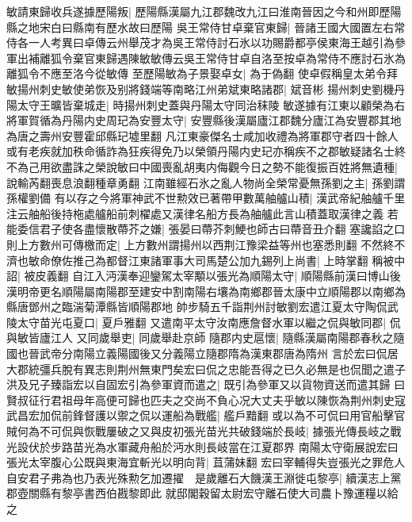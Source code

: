 敏請東歸收兵遂據歷陽叛|{
	歷陽縣漢屬九江郡魏改九江曰淮南晉因之今和州即歷陽縣之地宋白曰縣南有歷水故曰歷陽}
吳王常侍甘卓棄官東歸|{
	晉諸王國大國置左右常侍各一人考異曰卓傳云州舉茂才為吳王常侍討石氷以功賜爵都亭侯東海王越引為參軍出補離狐令棄官東歸遇陳敏敏傳云吳王常侍甘卓自洛至按卓為常侍不應討石氷為離狐令不應至洛今從敏傳}
至歷陽敏為子景娶卓女|{
	為于偽翻}
使卓假稱皇太弟令拜敏揚州刺史敏使弟恢及别將錢端等南略江州弟斌東略諸郡|{
	斌音彬}
揚州刺史劉機丹陽太守王曠皆棄城走|{
	時揚州刺史蓋與丹陽太守同治秣陵}
敏遂據有江東以顧榮為右將軍賀循為丹陽内史周玘為安豐太守|{
	安豐縣後漢屬廬江郡魏分廬江為安豐郡其地為唐之壽州安豐霍邱縣玘墟里翻}
凡江東豪傑名士咸加收禮為將軍郡守者四十餘人或有老疾就加秩命循詐為狂疾得免乃以榮領丹陽内史玘亦稱疾不之郡敏疑諸名士終不為己用欲盡誅之榮說敏曰中國喪亂胡夷内侮觀今日之勢不能復振百姓將無遺種|{
	說輸芮翻喪息浪翻種章勇翻}
江南雖經石氷之亂人物尚全榮常憂無孫劉之主|{
	孫劉謂孫權劉備}
有以存之今將軍神武不世勲效已著帶甲數萬舳艫山積|{
	漢武帝紀舳艫千里注云舳船後持柂處艫船前刺櫂處又漢律名船方長為舳艫此言山積蓋取漢律之義}
若能委信君子使各盡懷散蔕芥之嫌|{
	張晏曰蔕芥刺鯁也師古曰蔕音丑介翻}
塞讒諂之口則上方數州可傳檄而定|{
	上方數州謂揚州以西荆江豫梁益等州也塞悉則翻}
不然終不濟也敏命僚佐推己為都督江東諸軍事大司馬楚公加九錫列上尚書|{
	上時掌翻}
稱被中詔|{
	被皮義翻}
自江入沔漢奉迎鑾駕太宰顒以張光為順陽太守|{
	順陽縣前漢曰博山後漢明帝更名順陽屬南陽郡至建安中割南陽右壤為南鄉郡晉太康中立順陽郡以南鄉為縣唐鄧州之臨湍菊潭縣皆順陽郡地}
帥步騎五千詣荆州討敏劉宏遣江夏太守陶侃武陵太守苗光屯夏口|{
	夏戶雅翻}
又遣南平太守汝南應詹督水軍以繼之侃與敏同郡|{
	侃與敏皆廬江人}
又同歲舉吏|{
	同歲舉赴京師}
隨郡内史扈懷|{
	隨縣漢屬南陽郡春秋之隨國也晉武帝分南陽立義陽國後又分義陽立隨郡隋為漢東郡唐為隋州}
言於宏曰侃居大郡統彊兵脫有異志則荆州無東門矣宏曰侃之忠能吾得之已久必無是也侃聞之遣子洪及兄子臻詣宏以自固宏引為參軍資而遣之|{
	既引為參軍又以貨物資送而遣其歸}
曰賢叔征行君祖母年高便可歸也匹夫之交尚不負心况大丈夫乎敏以陳恢為荆州刺史寇武昌宏加侃前鋒督護以禦之侃以運船為戰艦|{
	艦戶黯翻}
或以為不可侃曰用官船擊官賊何為不可侃與恢戰屢破之又與皮初張光苗光共破錢端於長岐|{
	據張光傳長岐之戰光設伏於步路苗光為水軍藏舟船於沔水則長岐當在江夏郡界}
南陽太守衛展說宏曰張光太宰腹心公既與東海宜斬光以明向背|{
	苴蒲妹翻}
宏曰宰輔得失豈張光之罪危人自安君子弗為也乃表光殊勲乞加遷擢　是歲離石大饑漢王淵徙屯黎亭|{
	續漢志上黨郡壺關縣有黎亭書西伯戡黎即此}
就邸閣穀留太尉宏守離石使大司農卜豫運糧以給之

